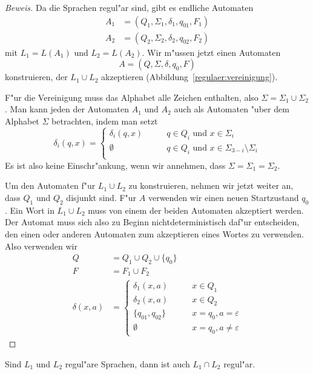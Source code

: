 \begin{proof}[Beweis]
Da die Sprachen regul"ar sind, gibt es endliche Automaten 
\begin{align*}
A_1&=(Q_1,\Sigma_1,\delta_1, q_{01}, F_1)\\
A_2&=(Q_2,\Sigma_2,\delta_2, q_{02}, F_2)
\end{align*}
mit $L_1=L(A_1)$ und $L_2=L(A_2)$. Wir m"ussen
jetzt einen Automaten
\[
A = (Q, \Sigma, \delta, q_0, F)
\]
konstruieren, der $L_1\cup L_2$ akzeptieren
(Abbildung~\ref{regulaer:vereinigung}).

F"ur die Vereinigung muss das Alphabet alle Zeichen enthalten,
also $\Sigma = \Sigma_1\cup\Sigma_2$. Man kann jeden der Automaten 
$A_1$ und $A_2$ auch als Automaten "uber dem Alphabet $\Sigma$
betrachten, indem man setzt
\[
\delta_i(q, x)=\begin{cases}
\delta_i(q,x)&\qquad q\in Q_i\text{ und } x\in \Sigma_i\\
\emptyset&\qquad q\in Q_i\text{ und } x\in \Sigma_{3-i}\setminus \Sigma_i\\
\end{cases}
\]
Es ist also keine Einschr"ankung, wenn wir annehmen, dass
$\Sigma=\Sigma_1=\Sigma_2$.

Um den Automaten f"ur $L_1\cup L_2$ zu konstruieren, nehmen wir jetzt
weiter an, dass $Q_1$ und $Q_2$ disjunkt sind.
F"ur $A$ verwenden wir einen neuen Startzustand $q_0$.
Ein Wort in $L_1\cup L_2$ muss von einem der beiden Automaten
akzeptiert werden.
Der Automat muss sich also zu Beginn nichtdeterministisch
daf"ur entscheiden, den einen oder anderen Automaten zum
akzeptieren eines Wortes zu verwenden.
Also verwenden wir 
\begin{align*}
Q&=Q_1\cup Q_2\cup \{q_0\}\\
F&=F_1\cup F_2\\
\delta(x,a)&=\begin{cases}
\delta_1(x,a)&\qquad x\in Q_1\\
\delta_2(x,a)&\qquad x\in Q_2\\
\{q_{01}, q_{02}\}&\qquad x=q_0, a=\varepsilon\\
\emptyset&\qquad x=q_0, a\ne\varepsilon
\end{cases}
\end{align*}
\end{proof}

\begin{satz}
\label{satz_intersection}
Sind $L_1$ und $L_2$ regul"are Sprachen, dann
ist auch $L_1\cap L_2$ regul"ar.
\end{satz}

